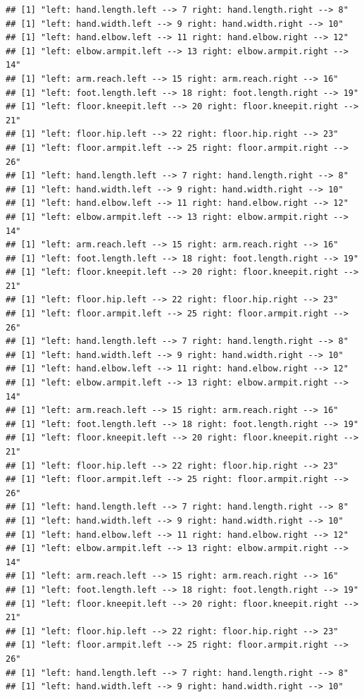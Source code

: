 \documentclass[]{article}
\begin{document}
\begin{verbatim}
## [1] "left: hand.length.left --> 7 right: hand.length.right --> 8"
## [1] "left: hand.width.left --> 9 right: hand.width.right --> 10"
## [1] "left: hand.elbow.left --> 11 right: hand.elbow.right --> 12"
## [1] "left: elbow.armpit.left --> 13 right: elbow.armpit.right --> 14"
## [1] "left: arm.reach.left --> 15 right: arm.reach.right --> 16"
## [1] "left: foot.length.left --> 18 right: foot.length.right --> 19"
## [1] "left: floor.kneepit.left --> 20 right: floor.kneepit.right --> 21"
## [1] "left: floor.hip.left --> 22 right: floor.hip.right --> 23"
## [1] "left: floor.armpit.left --> 25 right: floor.armpit.right --> 26"
## [1] "left: hand.length.left --> 7 right: hand.length.right --> 8"
## [1] "left: hand.width.left --> 9 right: hand.width.right --> 10"
## [1] "left: hand.elbow.left --> 11 right: hand.elbow.right --> 12"
## [1] "left: elbow.armpit.left --> 13 right: elbow.armpit.right --> 14"
## [1] "left: arm.reach.left --> 15 right: arm.reach.right --> 16"
## [1] "left: foot.length.left --> 18 right: foot.length.right --> 19"
## [1] "left: floor.kneepit.left --> 20 right: floor.kneepit.right --> 21"
## [1] "left: floor.hip.left --> 22 right: floor.hip.right --> 23"
## [1] "left: floor.armpit.left --> 25 right: floor.armpit.right --> 26"
## [1] "left: hand.length.left --> 7 right: hand.length.right --> 8"
## [1] "left: hand.width.left --> 9 right: hand.width.right --> 10"
## [1] "left: hand.elbow.left --> 11 right: hand.elbow.right --> 12"
## [1] "left: elbow.armpit.left --> 13 right: elbow.armpit.right --> 14"
## [1] "left: arm.reach.left --> 15 right: arm.reach.right --> 16"
## [1] "left: foot.length.left --> 18 right: foot.length.right --> 19"
## [1] "left: floor.kneepit.left --> 20 right: floor.kneepit.right --> 21"
## [1] "left: floor.hip.left --> 22 right: floor.hip.right --> 23"
## [1] "left: floor.armpit.left --> 25 right: floor.armpit.right --> 26"
## [1] "left: hand.length.left --> 7 right: hand.length.right --> 8"
## [1] "left: hand.width.left --> 9 right: hand.width.right --> 10"
## [1] "left: hand.elbow.left --> 11 right: hand.elbow.right --> 12"
## [1] "left: elbow.armpit.left --> 13 right: elbow.armpit.right --> 14"
## [1] "left: arm.reach.left --> 15 right: arm.reach.right --> 16"
## [1] "left: foot.length.left --> 18 right: foot.length.right --> 19"
## [1] "left: floor.kneepit.left --> 20 right: floor.kneepit.right --> 21"
## [1] "left: floor.hip.left --> 22 right: floor.hip.right --> 23"
## [1] "left: floor.armpit.left --> 25 right: floor.armpit.right --> 26"
## [1] "left: hand.length.left --> 7 right: hand.length.right --> 8"
## [1] "left: hand.width.left --> 9 right: hand.width.right --> 10"

\end{verbatim}
\end{document}
